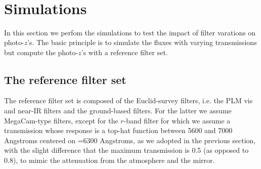 \documentclass[11pt]{article}
\begin{document}
    \begin{center}
    \end{center}
    { \hspace*{\fill} \\}
    
    \begin{center}
    \end{center}
    { \hspace*{\fill} \\}
    
    \begin{center}
    \end{center}
    { \hspace*{\fill} \\}
    
    \begin{center}
    \end{center}
    { \hspace*{\fill} \\}
    
    \section{Simulations}\label{simulations}

In this section we perfom the simulations to test the impact of filter
varations on photo-\(z\)'s. The basic principle is to simulate the
fluxes with varying transmissions but compute the photo-\(z\)'s with a
reference filter set.

\subsection{The reference filter set}\label{the-reference-filter-set}

The reference filter set is composed of the Euclid-survey filters, i.e.
the PLM vis and near-IR filters and the ground-based filters. For the
latter we assume MegaCam-type filters, except for the \(r\)-band filter
for which we assume a transmission whose response is a top-hat function
between 5600 and 7000 Angstroms centered on =6300 Angstroms, as we
adopted in the previous section, with the slight difference that the
maximum transmission is 0.5 (as opposed to 0.8), to mimic the
attenuation from the atmosphere and the mirror.
\end{document}
